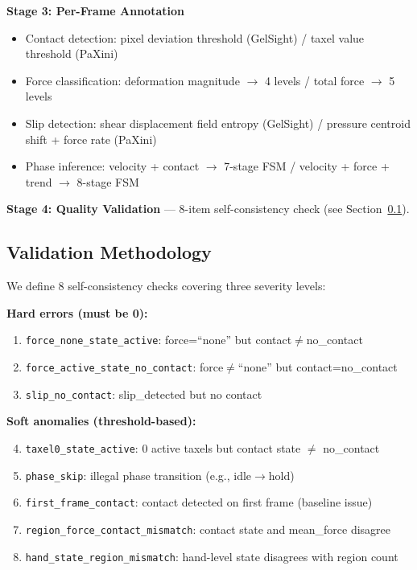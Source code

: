 \documentclass[conference]{IEEEtran}
\begin{document}
\textbf{Stage 3: Per-Frame Annotation}
\begin{itemize}
\item Contact detection: pixel deviation threshold (GelSight) / taxel value threshold (PaXini)
\item Force classification: deformation magnitude $\rightarrow$ 4 levels / total force $\rightarrow$ 5 levels
\item Slip detection: shear displacement field entropy (GelSight) / pressure centroid shift + force rate (PaXini)
\item Phase inference: velocity + contact $\rightarrow$ 7-stage FSM / velocity + force + trend $\rightarrow$ 8-stage FSM
\end{itemize}

\textbf{Stage 4: Quality Validation} --- 8-item self-consistency check (see Section~\ref{sec:validation}).

\subsection{Validation Methodology}
\label{sec:validation}

We define 8 self-consistency checks covering three severity levels:

\textbf{Hard errors (must be 0):}
\begin{enumerate}
\item \texttt{force\_none\_state\_active}: force=``none'' but contact$\neq$no\_contact
\item \texttt{force\_active\_state\_no\_contact}: force$\neq$``none'' but contact=no\_contact
\item \texttt{slip\_no\_contact}: slip\_detected but no contact
\end{enumerate}

\textbf{Soft anomalies (threshold-based):}
\begin{enumerate}\setcounter{enumi}{3}
\item \texttt{taxel0\_state\_active}: 0 active taxels but contact state $\neq$ no\_contact
\item \texttt{phase\_skip}: illegal phase transition (e.g., idle$\rightarrow$hold)
\item \texttt{first\_frame\_contact}: contact detected on first frame (baseline issue)
\item \texttt{region\_force\_contact\_mismatch}: contact state and mean\_force disagree
\item \texttt{hand\_state\_region\_mismatch}: hand-level state disagrees with region count
\end{enumerate}
\end{document}
